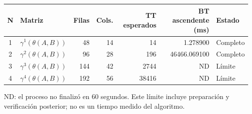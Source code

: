 \begin{tabular}{c l r r r r l}
\toprule
N & Matriz & Filas & Cols. & TT esperados & BT ascendente (ms) & Estado \\
\midrule
1 & $\gamma^{1}(\theta(A,B))$ & 48 & 14 & 14 & 1.278900 & Completo \\
2 & $\gamma^{2}(\theta(A,B))$ & 96 & 28 & 196 & 46466.069100 & Completo \\
3 & $\gamma^{3}(\theta(A,B))$ & 144 & 42 & 2744 & ND & Límite \\
4 & $\gamma^{4}(\theta(A,B))$ & 192 & 56 & 38416 & ND & Límite \\
\bottomrule
\end{tabular}
{\footnotesize ND: el proceso no finalizó en 60 segundos. Este límite incluye preparación y verificación posterior; no es un tiempo medido del algoritmo.\par}
